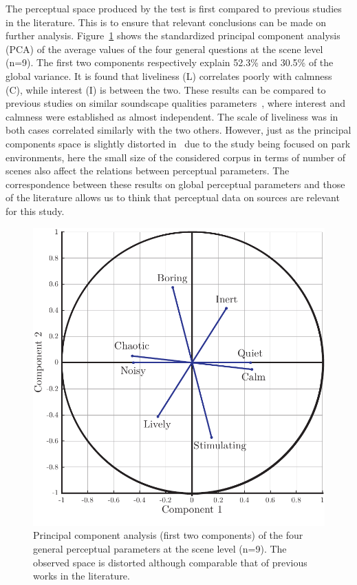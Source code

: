 \documentclass{article}
\begin{document}
\begin{sloppy}
The perceptual space produced by the test is first compared to previous studies in the literature. This is to ensure that relevant conclusions can be made on further analysis. Figure~\ref{fig:pca} shows the standardized principal component analysis (PCA) of the average values of the four general questions at the scene level (n=9). The first two components respectively explain 52.3\% and 30.5\% of the global variance. It is found that liveliness (L) correlates poorly with calmness (C), while interest (I) is between the two. These results can be compared to previous studies on similar soundscape qualities parameters~\cite{axelsson2010, cain2013, jeon2018}, where interest and calmness were established as almost independent. The scale of liveliness was in both cases correlated similarly with the two others. However, just as the principal components space is slightly distorted in~\cite{jeon2018} due to the study being focused on park environments, here the small size of the considered corpus in terms of number of scenes also affect the relations between perceptual parameters. The correspondence between these results on global perceptual parameters and those of the literature allows us to think that perceptual data on sources are relevant for this study.

\begin{figure}[t]
  \centering
  \centerline{\includegraphics[width=0.8\columnwidth]{pca.pdf}}
  \caption{Principal component analysis (first two components) of the four general perceptual parameters at the scene level (n=9). The observed space is distorted although comparable that of previous works in the literature.}
  \label{fig:pca}
\end{figure}


\end{sloppy}
\end{document}
